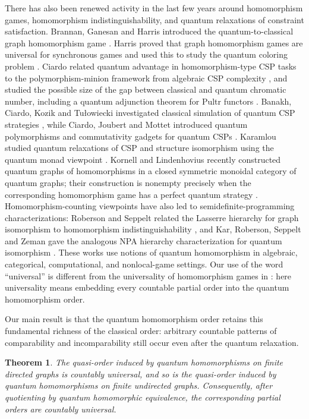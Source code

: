 \documentclass[11pt]{amsart}
\theoremstyle{plain}
\newtheorem{theorem}{Theorem}[section]
\theoremstyle{definition}
\begin{document}
There has also been renewed activity in the last few years around homomorphism games, homomorphism indistinguishability, and quantum relaxations of constraint satisfaction.  Brannan, Ganesan and Harris introduced the quantum-to-classical graph homomorphism game \cite{BrannanGanesanHarris}.  Harris proved that graph homomorphism games are universal for synchronous games and used this to study the quantum coloring problem \cite{HarrisUniversalityGames}.  Ciardo related quantum advantage in homomorphism-type CSP tasks to the polymorphism-minion framework from algebraic CSP complexity \cite{CiardoQuantumAdvantage}, and studied the possible size of the gap between classical and quantum chromatic number, including a quantum adjunction theorem for Pultr functors \cite{CiardoQuantumChromaticGap}.  Banakh, Ciardo, Kozik and Tu\l{}owiecki investigated classical simulation of quantum CSP strategies \cite{BanakhCiardoKozikTulowiecki}, while Ciardo, Joubert and Mottet introduced quantum polymorphisms and commutativity gadgets for quantum CSPs \cite{CiardoJoubertMottet}.  Karamlou studied quantum relaxations of CSP and structure isomorphism using the quantum monad viewpoint \cite{KaramlouQuantumRelaxations}.  Kornell and Lindenhovius recently constructed quantum graphs of homomorphisms in a closed symmetric monoidal category of quantum graphs; their construction is nonempty precisely when the corresponding homomorphism game has a perfect quantum strategy \cite{KornellLindenhovius}.  Homomorphism-counting viewpoints have also led to semidefinite-programming characterizations: Roberson and Seppelt related the Lasserre hierarchy for graph isomorphism to homomorphism indistinguishability \cite{RobersonSeppeltLasserre}, and Kar, Roberson, Seppelt and Zeman gave the analogous NPA hierarchy characterization for quantum isomorphism \cite{KarRobersonSeppeltZeman}.  These works use notions of quantum homomorphism in algebraic, categorical, computational, and nonlocal-game settings.  Our use of the word ``universal'' is different from the universality of homomorphism games in \cite{HarrisUniversalityGames}: here universality means embedding every countable partial order into the quantum homomorphism order.

Our main result is that the quantum homomorphism order retains this fundamental richness of the classical order: arbitrary countable patterns of comparability and incomparability still occur even after the quantum relaxation.

\begin{theorem}\label{thm:main}
The quasi-order induced by quantum homomorphisms on finite directed graphs is countably universal, and so is the quasi-order induced by quantum homomorphisms on finite undirected graphs.  Consequently, after quotienting by quantum homomorphic equivalence, the corresponding partial orders are countably universal.
\end{theorem}
\end{document}
